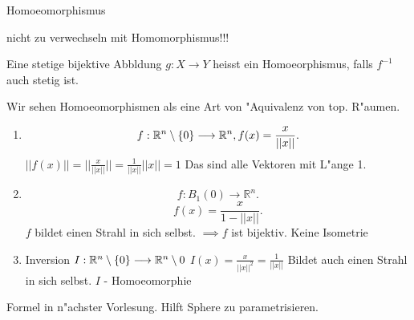 \documentclass[class=article, crop=false]{standalone}
\begin{document}
\begin{zettel}{Homoeomorphismus}
\begin{flashcard}
    nicht zu verwechseln mit Homomorphismus!!!
\begin{definition}[Homoeomorphismus]
   Eine stetige bijektive Abbldung $g:X \longrightarrow Y$  heisst ein Homoeorphismus, falls $f^{-1} $  auch stetig ist.
   \begin{remark}
      Wir sehen Homoeomorphismen als eine Art von "Aquivalenz von top. R"aumen. 
   \end{remark}
\end{definition}

\begin{example}
    \begin{enumerate}
    \item \[
        f: \mathbb{R}^n \setminus \set{0} \longrightarrow  \mathbb{R}^n , f(x) =  \frac{x}{ ||x||}
    .\]
    $ ||f(x)|| = ||\frac{x}{||x||}|| = \frac{1}{ ||x||} ||x|| = 1 $ 
    Das sind alle Vektoren mit L"ange 1.
     \item \[
         f: B_1 (0) \longrightarrow \mathbb{R}^n
     .\]
     \[
         f(x) =  \frac{x}{1 - ||x||} 
     .\]
     $f$ bildet einen Strahl in sich selbst. $\implies f$ ist bijektiv. Keine Isometrie

     \item Inversion $I: \mathbb{R}^n \setminus \set{0} \longrightarrow  \R^n \setminus 0$  \quad $I(x) = \frac{x}{ ||x||^2 } = \frac{1}{ ||x||}  $ Bildet auch einen Strahl in sich selbst. $I$ - Homoeomorphie
    \end{enumerate}
\end{example}

\begin{example}
    Formel in n"achster Vorlesung. Hilft Sphere zu parametrisieren.
\end{example}

\end{flashcard}
\end{zettel}
\end{document}

